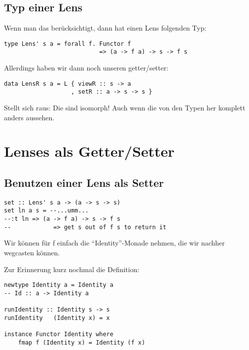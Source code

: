 \documentclass{beamer}
\begin{document}
\subsection{Typ einer Lens}
\begin{frame}[fragile]
Wenn man das berücksichtigt, dann hat einen Lens folgenden Typ:

\begin{verbatim}
type Lens' s a = forall f. Functor f
                           => (a -> f a) -> s -> f s
\end{verbatim}
\pause
Allerdings haben wir dann noch unseren getter/setter:

\begin{verbatim}
data LensR s a = L { viewR :: s -> a
                   , setR :: a -> s -> s }
\end{verbatim}
\pause
Stellt sich raus: Die sind isomorph! Auch wenn die von den Typen her
komplett anders aussehen.
\end{frame}

\section{Lenses als Getter/Setter}
\subsection{Benutzen einer Lens als Setter}
\begin{frame}[fragile]
\begin{verbatim}
set :: Lens' s a -> (a -> s -> s)
set ln a s = --...umm...
--:t ln => (a -> f a) -> s -> f s
--            => get s out of f s to return it
\end{verbatim}

Wir können für f einfach die ``Identity''-Monade nehmen, die wir nachher
wegcasten können.
\end{frame}

\begin{frame}[fragile]
Zur Erinnerung kurz nochmal die Definition:
\begin{verbatim}
newtype Identity a = Identity a
-- Id :: a -> Identity a

runIdentity :: Identity s -> s
runIdentity   (Identity x) = x

instance Functor Identity where
    fmap f (Identity x) = Identity (f x)
\end{verbatim}
\end{frame}
\end{document}
